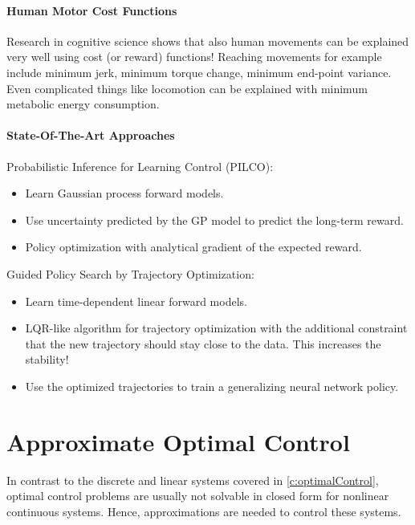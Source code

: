 			\subsubsection{Human Motor Cost Functions}
				Research in cognitive science shows that also human movements can be explained very well using cost (or reward) functions! Reaching movements for example include minimum jerk, minimum torque change, minimum end-point variance. Even complicated things like locomotion can be explained with minimum metabolic energy consumption.

			\subsubsection{State-Of-The-Art Approaches}
				Probabilistic Inference for Learning Control (PILCO):
				\begin{itemize}
					\item Learn Gaussian process forward models.
					\item Use uncertainty predicted by the GP model to predict the long-term reward.
					\item Policy optimization with analytical gradient of the expected reward.
				\end{itemize}
				Guided Policy Search by Trajectory Optimization:
				\begin{itemize}
					\item Learn time-dependent linear forward models.
					\item LQR-like algorithm for trajectory optimization with the additional constraint that the new trajectory should stay close to the data. This increases the stability!
					\item Use the optimized trajectories to train a generalizing neural network policy.
				\end{itemize}

\chapter{Approximate Optimal Control}
	\label{c:approximateOptimalControl}

	In contrast to the discrete and linear systems covered in \autoref{c:optimalControl}, optimal control problems are usually not solvable in closed form for nonlinear continuous systems. Hence, approximations are needed to control these systems.

